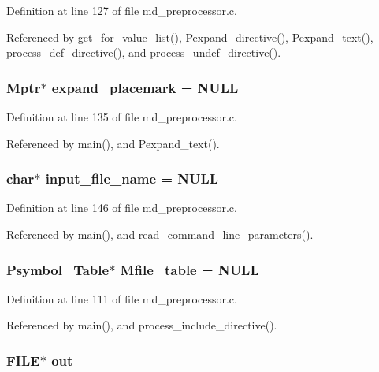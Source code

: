 Definition at line 127 of file md\_\-preprocessor.c.

Referenced by get\_\-for\_\-value\_\-list(), Pexpand\_\-directive(), Pexpand\_\-text(), process\_\-def\_\-directive(), and process\_\-undef\_\-directive().
\subsubsection{\setlength{\rightskip}{0pt plus 5cm}\bf{Mptr}$\ast$ \bf{expand\_\-placemark} = \bf{NULL}}\label{md__preprocessor_8c_d1c53c5ecf7324077480c8560900b248}




Definition at line 135 of file md\_\-preprocessor.c.

Referenced by main(), and Pexpand\_\-text().
\subsubsection{\setlength{\rightskip}{0pt plus 5cm}char$\ast$ \bf{input\_\-file\_\-name} = \bf{NULL}}\label{md__preprocessor_8c_a91ff4ee3ee60baee9c097d4da3e3d18}




Definition at line 146 of file md\_\-preprocessor.c.

Referenced by main(), and read\_\-command\_\-line\_\-parameters().
\subsubsection{\setlength{\rightskip}{0pt plus 5cm}\bf{Psymbol\_\-Table}$\ast$ \bf{Mfile\_\-table} = \bf{NULL}}\label{md__preprocessor_8c_134cbad6e978db177d4d05dff9fd74d2}




Definition at line 111 of file md\_\-preprocessor.c.

Referenced by main(), and process\_\-include\_\-directive().
\subsubsection{\setlength{\rightskip}{0pt plus 5cm}FILE$\ast$ \bf{out}}\label{md__preprocessor_8c_1277960b5f2b37137fe9b0b5a1ea0beb}




